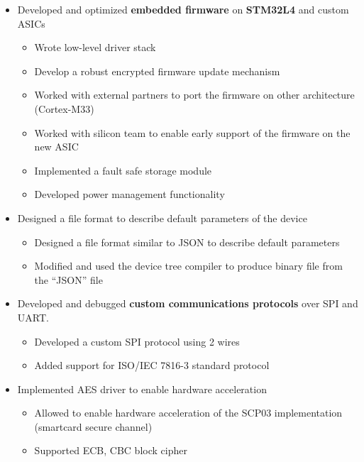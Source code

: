 \documentclass[10pt,a4paper]{altacv}
\begin{document}
\begin{paracol}{2}


\begin{itemize}
\item Developed and optimized \textbf{\textcolor{bold}{embedded firmware}} on \textbf{\textcolor{bold}{STM32L4}} and custom ASICs
\begin{itemize}
    \item Wrote low-level driver stack
    \item Develop a robust encrypted firmware update mechanism
    \item Worked with external partners to port the firmware on other architecture (Cortex-M33)
    \item Worked with silicon team to enable early support of the firmware on the new ASIC
    \item Implemented a fault safe storage module
    \item Developed power management functionality
\end{itemize}
\item Designed a file format to describe default parameters of the device
\begin{itemize}
    \item Designed a file format similar to JSON to describe default parameters
    \item Modified and used the device tree compiler to produce binary file from the “JSON” file
\end{itemize}
\item Developed and debugged \textbf{\textcolor{bold}{custom communications protocols}} over SPI and UART.
\begin{itemize}
    \item Developed a custom SPI protocol using 2 wires 
    \item Added support for ISO/IEC 7816-3 standard protocol
\end{itemize}
\item Implemented AES driver to enable hardware acceleration
\begin{itemize}
    \item Allowed to enable hardware acceleration of the SCP03 implementation (smartcard secure channel)
    \item Supported ECB, CBC block cipher

\end{itemize}
\end{itemize}
\end{paracol}
\end{document}
